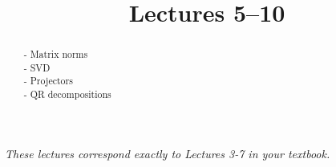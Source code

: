 \documentclass{ximera}
\begin{document}
    \title{Lectures 5--10}
    
    \begin{abstract} 
        - Matrix norms \\
        - SVD \\
        - Projectors \\
        - QR decompositions
    \end{abstract}
    \maketitle

\textit{These lectures correspond exactly to Lectures 3-7 in your textbook.}
\end{document}
